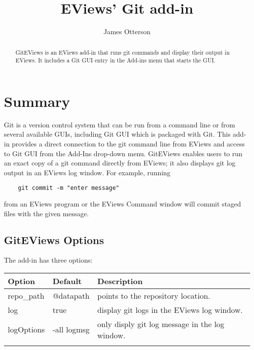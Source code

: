 \documentclass{article}
\title{EViews' Git add-in}
\author{James Otterson}
\date{}
\begin{document}
\maketitle

\renewcommand{\abstractname}{Overview}
\begin{abstract}
    GitEViews is an EViews add-in that runs git commands and display their output in EViews.  It includes a 
    Git GUI entry in the Add-ins menu that starts the GUI.
\end{abstract}

\section{Summary}

Git is a version control system that can be run from a command line or from several available GUIs, including Git GUI which is packaged with Git.  This add-in 
provides a direct connection to the git command line from EViews and access to Git GUI from the Add-Ins drop-down menu.  GitEViews enables users to run 
an exact copy of a git command directly from EViews; it also displays git log output in an EViews log window.  For example, running
 
\begin{verbatim}
    git commit -m "enter message"
\end{verbatim}

\noindent from an EViews program or the EViews Command window will commit staged files with the given message.  

\subsection{GitEViews Options}
  
  The add-in has three options: 
  \begin{table}[h!]
  \centering
  \begin{tabular}{lll} \hline \hline
    Option          & Default       & Description \\ \hline
    repo\_path      & @datapath     & points to the repository location. \\ 
    log             & true          & display git logs in the EViews log window. \\
    logOptions      & -all logmsg   & only disply git log message in the log window. \\ \hline \hline \\
  \end{tabular}
  \end{table}
\end{document}
